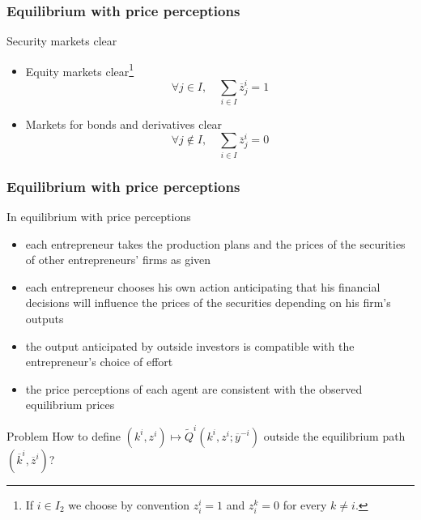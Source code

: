 \documentclass[blue]{beamer}
\theoremstyle{definition}
\theoremstyle{example}
\begin{document}

\begin{frame}\frametitle{Equilibrium with price perceptions}

\begin{block}{Security markets clear}
\begin{itemize}
\item Equity markets clear\footnote{If $i\in I_2$ we choose by convention $z^i_i =1$ and $z^k_i=0$ for every $k\neq i$.}
\[
\forall j\in I, \quad \sum_{i\in I} \overline{z}^i_j = 1
\]
\item Markets for bonds and derivatives clear
\[
\forall j\not \in I, \quad \sum_{i\in I} \overline{z}^i_j = 0
\]
\end{itemize}
\end{block}

\end{frame}



\begin{frame}\frametitle{Equilibrium with price perceptions}

In equilibrium with price perceptions
\begin{itemize}
\item each entrepreneur takes the production plans and the prices of the securities of other entrepreneurs' firms as given
\item each entrepreneur chooses his own action anticipating that his financial decisions will influence the prices of the securities depending on his firm's outputs
\item the output anticipated by outside investors is compatible with the entrepreneur's choice of effort
\item the price perceptions of each agent are consistent with the observed equilibrium prices
\end{itemize}

\begin{block}{Problem}
How to define $(k^i,z^i) \mapsto \widetilde{Q}^i(k^i,z^i;\overline{y}^{-i})$ outside the equilibrium path $(\overline{k}^i,\overline{z}^i)$?
\end{block}

\end{frame}

\end{document}
